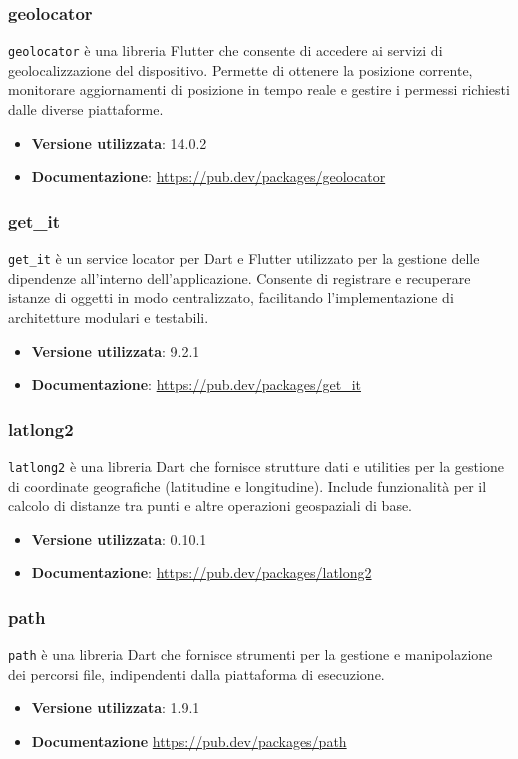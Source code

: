 \documentclass[a4paper,12pt]{article}
\begin{document}
\subsubsection{geolocator}
\texttt{geolocator} è una libreria Flutter che consente di accedere ai servizi di geolocalizzazione del dispositivo. Permette di ottenere la posizione corrente, monitorare aggiornamenti di posizione in tempo reale e gestire i permessi richiesti dalle diverse piattaforme.
\begin{itemize}
    \item \textbf{Versione utilizzata}: 14.0.2
    \item \textbf{Documentazione}: \url{https://pub.dev/packages/geolocator}
\end{itemize}

\subsubsection{get\_it}
\texttt{get\_it} è un service locator per Dart e Flutter utilizzato per la gestione delle dipendenze all'interno dell'applicazione. Consente di registrare e recuperare istanze di oggetti in modo centralizzato, facilitando l'implementazione di architetture modulari e testabili.
\begin{itemize}
    \item \textbf{Versione utilizzata}: 9.2.1
    \item \textbf{Documentazione}: \url{https://pub.dev/packages/get_it}
\end{itemize}

\subsubsection{latlong2}
\texttt{latlong2} è una libreria Dart che fornisce strutture dati e utilities per la gestione di coordinate geografiche (latitudine e longitudine). Include funzionalità per il calcolo di distanze tra punti e altre operazioni geospaziali di base.
\begin{itemize}
    \item \textbf{Versione utilizzata}: 0.10.1
    \item \textbf{Documentazione}: \url{https://pub.dev/packages/latlong2}
\end{itemize}

\subsubsection{path}
\texttt{path} è una libreria Dart che fornisce strumenti per la gestione e manipolazione dei percorsi file, indipendenti dalla piattaforma di esecuzione. 
\begin{itemize}
    \item \textbf{Versione utilizzata}: 1.9.1
    \item \textbf{Documentazione} \url{https://pub.dev/packages/path}
\end{itemize}
\end{document}
